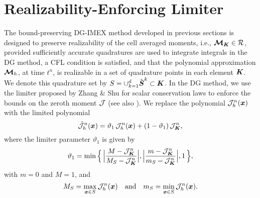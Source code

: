 \section{Realizability-Enforcing Limiter}
\label{sec:limiter}

The bound-preserving DG-IMEX method developed in previous sections is designed to preserve realizability of the cell averaged moments, i.e., $\boldsymbol{\mathcal{M}}_{\boldsymbol{K}}\in\mathcal{R}$, provided sufficiently accurate quadratures are used to integrate integrals in the DG method, a CFL condition is satisfied, and that the polynomial approximation $\boldsymbol{\mathcal{M}}_{h}$, at time $t^{n}$, is realizable in a set of quadrature points in each element $\boldsymbol{K}$.  
We denote this quadrature set by $S=\cup_{k=1}^{d}\hat{\boldsymbol{S}}^{k}\subset\boldsymbol{K}$.  
In the DG method, we use the limiter proposed by Zhang \& Shu \cite{zhangShu_2010a} for scalar conservation laws to enforce the bounds on the zeroth moment $\mathcal{J}$ (see also \cite{liuOsher_1996}).  
We replace the polynomial $\mathcal{J}_{h}^{n}(\boldsymbol{x})$ with the limited polynomial
\begin{equation}
  \tilde{\mathcal{J}}_{h}^{n}(\boldsymbol{x})
  =\vartheta_{1}\,\mathcal{J}_{h}^{n}(\boldsymbol{x})+(1-\vartheta_{1})\,\mathcal{J}_{\boldsymbol{K}}^{n},
  \label{eq:limitDensity}
\end{equation}
where the limiter parameter $\vartheta_{1}$ is given by
\begin{equation}
  \vartheta_{1}
  =\min\Big\{\,\Big|\frac{M-\mathcal{J}_{\boldsymbol{K}}^{n}}{M_{S}-\mathcal{J}_{\boldsymbol{K}}^{n}}\Big|,\Big|\frac{m-\mathcal{J}_{\boldsymbol{K}}^{n}}{m_{S}-\mathcal{J}_{\boldsymbol{K}}^{n}}\Big|,1\,\Big\},
\end{equation}
with $m=0$ and $M=1$, and
\begin{equation}
  M_{S}=\max_{\boldsymbol{x}\in S}\mathcal{J}_{h}^{n}(\boldsymbol{x})
  \quad\text{and}\quad
  m_{S}=\min_{\boldsymbol{x}\in S}\mathcal{J}_{h}^{n}(\boldsymbol{x}).  
\end{equation}

